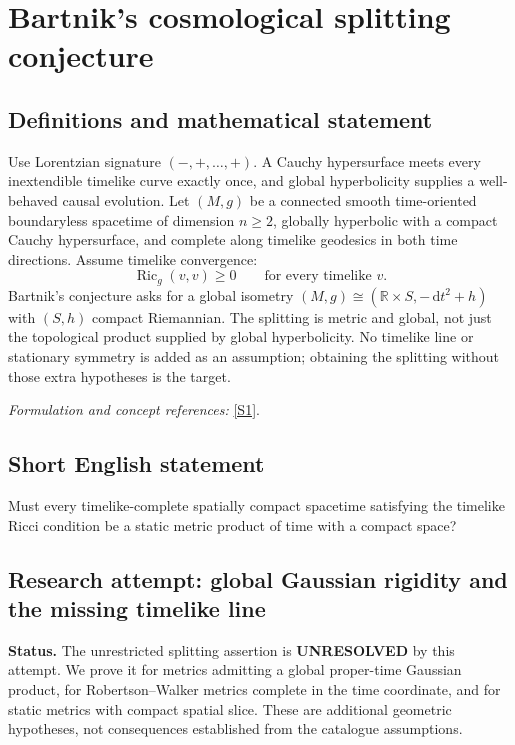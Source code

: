 \documentclass[11pt]{article}
\begin{document}
\section*{\texorpdfstring{Bartnik's cosmological splitting conjecture}{Bartnik's cosmological splitting conjecture}}\label{30006904}
\subsection{Definitions and mathematical statement}
Use Lorentzian signature $(-,+,\ldots,+)$. A Cauchy hypersurface meets every inextendible timelike curve exactly once, and global hyperbolicity supplies a well-behaved causal evolution. Let $(M,g)$ be a connected smooth time-oriented boundaryless spacetime of dimension $n\ge2$, globally hyperbolic with a compact Cauchy hypersurface, and complete along timelike geodesics in both time directions. Assume timelike convergence:
\[
 \operatorname{Ric}_g(v,v)\ge0\qquad\text{for every timelike }v.
\]
Bartnik's conjecture asks for a global isometry $(M,g)\cong({\mathbb{R}}\times S,-{\,\mathrm{d}} t^2+h)$ with $(S,h)$ compact Riemannian. The splitting is metric and global, not just the topological product supplied by global hyperbolicity. No timelike line or stationary symmetry is added as an assumption; obtaining the splitting without those extra hypotheses is the target.
\par\smallskip\textit{Formulation and concept references:} \href{https://arxiv.org/html/1810.03183v2}{[S1]}.

\subsection{Short English statement}
Must every timelike-complete spatially compact spacetime satisfying the timelike Ricci condition be a static metric product of time with a compact space?
\subsection{Research attempt: global Gaussian rigidity and the missing timelike line}
\textbf{Status.} The unrestricted splitting assertion is \textbf{UNRESOLVED} by this attempt. We prove it for metrics admitting a global proper-time Gaussian product, for Robertson--Walker metrics complete in the time coordinate, and for static metrics with compact spatial slice. These are additional geometric hypotheses, not consequences established from the catalogue assumptions.
\end{document}
